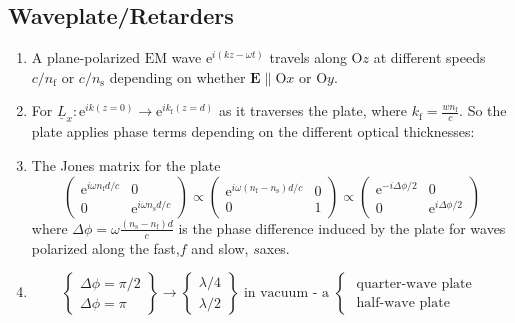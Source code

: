 \documentclass[12pt,a4paper]{article}
\begin{document}
\subsection{Waveplate/Retarders}
\begin{enumerate}
    \item A plane-polarized $\mathrm{EM}$ wave $\mathrm{e}^{i(k z-\omega t)}$ travels along $\mathrm{O} z$ at different speeds $c / n_{\mathrm{f}}$ or $c / n_{\mathrm{s}}$ depending on whether $\boldsymbol{E} \| \mathrm{O} x$ or $\mathrm{O} y$.
    \item For $\underline{L}_x: \mathrm{e}^{i k(z=0)} \longrightarrow \mathrm{e}^{i k_{\mathrm{f}}(z=d)}$ as it traverses the plate, where $k_{\mathrm{f}}=\frac{w n_{\mathrm{f}}}{c}$. So the plate applies phase terms depending on the different optical thicknesses:
    \item The Jones matrix for the plate
    $$
    \left(\begin{array}{cc}
    \mathrm{e}^{i \omega n_{\mathrm{f}} d / c} & 0 \\
    0 & \mathrm{e}^{i \omega n_{\mathrm{s}} d / c}
    \end{array}\right) \propto\left(\begin{array}{cc}
    \mathrm{e}^{i \omega\left(n_{\mathrm{f}}-n_{\mathrm{s}}\right) d / c} & 0 \\
    0 & 1
    \end{array}\right) \propto\left(\begin{array}{cc}
    \mathrm{e}^{-i \Delta \phi / 2} & 0 \\
    0 & \mathrm{e}^{i \Delta \phi / 2}
    \end{array}\right)
    $$
    where $\Delta \phi=\omega \frac{\left(n_{\mathrm{s}}-n_{\mathrm{f}}\right) d}{c}$ is the phase difference induced by the plate for waves polarized along the fast,$f$  and slow, $s$axes.
    \item 
    $$
    \left\{\begin{array}{c}
    \Delta \phi=\pi / 2 \\
    \Delta \phi=\pi
    \end{array}\right\} \longrightarrow\left\{\begin{array}{c}
    \lambda / 4 \\
    \lambda / 2
    \end{array}\right\} \text { in vacuum - a }\left\{\begin{array}{c}
    \text { quarter-wave plate } \\
    \text { half-wave plate }

\end{array}$$
\end{enumerate}
\end{document}
